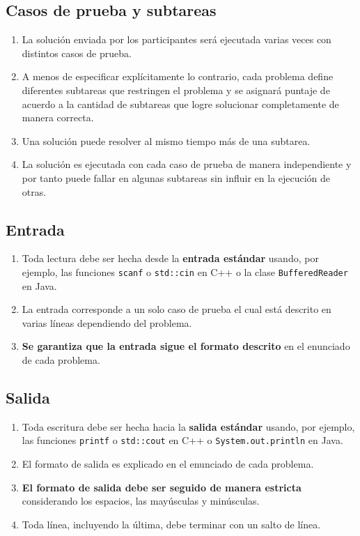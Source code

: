 \documentclass[12pt]{oci}
\begin{document}
\subsection*{Casos de prueba y subtareas}
\begin{enumerate}
\item La solución enviada por los participantes será ejecutada varias veces con
  distintos casos de prueba.
\item A menos de especificar explícitamente lo contrario, cada problema define
  diferentes subtareas que restringen el problema y se asignará puntaje de
  acuerdo a la cantidad de subtareas que logre solucionar completamente de
  manera correcta.
\item Una solución puede resolver al mismo tiempo más de una subtarea.
\item La solución es ejecutada con cada caso de prueba de manera independiente y
  por tanto puede fallar en algunas subtareas sin influir en la ejecución de
  otras.
\end{enumerate}

\subsection*{Entrada}
\begin{enumerate}
\item Toda lectura debe ser hecha desde la {\bf entrada estándar} usando, por
  ejemplo, las funciones \verb+scanf+ o \verb+std::cin+ en C++ o la clase
  \verb+BufferedReader+ en Java.
\item La entrada corresponde a un solo caso de prueba el cual está descrito en
  varias líneas dependiendo del problema.
\item {\bf Se garantiza que la entrada sigue el formato descrito} en el
  enunciado de cada problema.
\end{enumerate}

\newpage
\subsection*{Salida}
\begin{enumerate}
\item Toda escritura debe ser hecha hacia la {\bf salida estándar} usando, por
  ejemplo, las funciones \verb+printf+ o \verb+std::cout+ en C++  o
  \verb+System.out.println+ en Java.
\item El formato de salida es explicado en el enunciado de cada problema.
\item {\bf El formato de salida debe ser seguido de manera estricta}
  considerando los espacios, las mayúsculas y minúsculas.
\item Toda línea, incluyendo la última, debe terminar con un salto de línea.
\end{enumerate}
\end{document}
